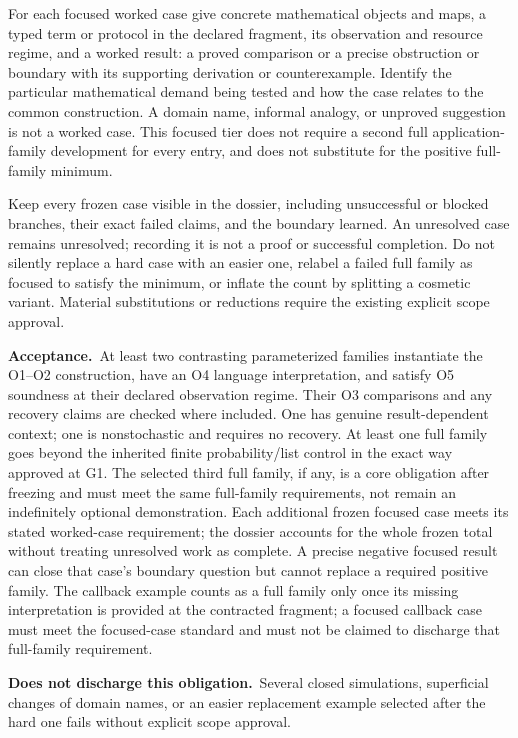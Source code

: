 \documentclass[11pt,a4paper]{article}
\newcommand{\accept}{\par\textbf{Acceptance.}\ }
\newcommand{\notaccepted}{\par\textbf{Does not discharge this obligation.}\ }
\begin{document}
For each focused worked case give concrete mathematical objects and maps,
a typed term or protocol in the declared fragment, its observation and
resource regime, and a worked result: a proved comparison or a precise
obstruction or boundary with its supporting derivation or counterexample.
Identify the particular mathematical demand being tested and how the case
relates to the common construction. A domain name, informal analogy, or
unproved suggestion is not a worked case. This focused tier does not require
a second full application-family development for every entry, and does not
substitute for the positive full-family minimum.

Keep every frozen case visible in the dossier, including unsuccessful or
blocked branches, their exact failed claims, and the boundary learned.
An unresolved case remains unresolved; recording it is not a proof or
successful completion. Do not silently replace a hard case with an easier
one, relabel a failed full family as focused to satisfy the minimum, or
inflate the count by splitting a cosmetic variant. Material substitutions
or reductions require the existing explicit scope approval.

\accept At least two contrasting parameterized families instantiate the O1--O2
construction, have an O4 language interpretation, and satisfy O5 soundness at
their declared observation regime. Their O3 comparisons and any recovery
claims are checked where included. One has genuine result-dependent context; one is
nonstochastic and requires no recovery. At least one full family goes beyond
the inherited finite probability/list control in the exact way approved at
G1. The selected third full family, if any, is a core obligation after
freezing and must meet the same full-family requirements, not remain an
indefinitely optional demonstration. Each additional frozen focused case
meets its stated worked-case requirement; the dossier accounts for the
whole frozen total without treating unresolved work as complete. A precise
negative focused result can close that case's boundary question but cannot
replace a required positive family. The callback example counts as a full
family only once its missing interpretation is provided at the contracted
fragment; a focused callback case must meet the focused-case standard and
must not be claimed to discharge that full-family requirement.

\notaccepted Several closed simulations, superficial changes of domain
names, or an easier replacement example selected after the hard one fails
without explicit scope approval.
\end{document}
